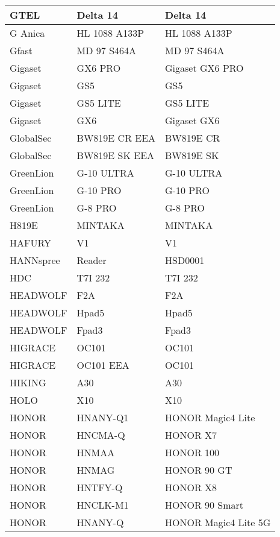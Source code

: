 \begin{tabularx}{\linewidth}{|l|X|X|}
        GTEL & Delta 14 & Delta 14 \\ \hline
        G Anica & HL 1088 A133P & HL 1088 A133P \\ \hline
        Gfast & MD 97 S464A & MD 97 S464A \\ \hline
        Gigaset & GX6 PRO & Gigaset GX6 PRO \\ \hline
        Gigaset & GS5 & GS5 \\ \hline
        Gigaset & GS5 LITE & GS5 LITE \\ \hline
        Gigaset & GX6 & Gigaset GX6 \\ \hline
        GlobalSec & BW819E CR EEA & BW819E CR \\ \hline
        GlobalSec & BW819E SK EEA & BW819E SK \\ \hline
        GreenLion & G-10 ULTRA & G-10 ULTRA \\ \hline
        GreenLion & G-10 PRO & G-10 PRO \\ \hline
        GreenLion & G-8 PRO & G-8 PRO \\ \hline
        H819E & MINTAKA & MINTAKA \\ \hline
        HAFURY & V1 & V1 \\ \hline
        HANNspree & Reader & HSD0001 \\ \hline
        HDC & T7I 232 & T7I 232 \\ \hline
        HEADWOLF & F2A & F2A \\ \hline
        HEADWOLF & Hpad5 & Hpad5 \\ \hline
        HEADWOLF & Fpad3 & Fpad3 \\ \hline
        HIGRACE & OC101 & OC101 \\ \hline
        HIGRACE & OC101 EEA & OC101 \\ \hline
        HIKING & A30 & A30 \\ \hline
        HOLO & X10 & X10 \\ \hline
        HONOR & HNANY-Q1 & HONOR Magic4 Lite \\ \hline
        HONOR & HNCMA-Q & HONOR X7 \\ \hline
        HONOR & HNMAA & HONOR 100 \\ \hline
        HONOR & HNMAG & HONOR 90 GT \\ \hline
        HONOR & HNTFY-Q & HONOR X8 \\ \hline
        HONOR & HNCLK-M1 & HONOR 90 Smart \\ \hline
        HONOR & HNANY-Q & HONOR Magic4 Lite 5G \\ \hline

\end{tabularx}
